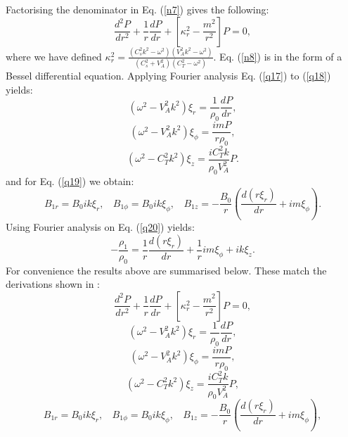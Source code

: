 \documentclass[12pt,a4paper,twoside]{article}
\begin{document}
Factorising the denominator in Eq. (\ref{n7}) gives the following:
\begin{equation}\label{n8}
 \frac{d^2P}{dr^2} + \frac{1}{r} \frac{dP}{dr}  + \left[ \kappa^2_r - \frac{m^2}{r^2}  \right] P =0 ,
\end{equation}
where we have defined $\kappa^2_r = \frac{ (C^2_sk^2-\omega^2)(V^2_Ak^2-\omega^2) }{(C_s^2+V^2_A) (C^2_T - \omega^2)  } $. Eq. (\ref{n8}) is in the form of a Bessel differential equation. Applying Fourier analysis Eq. (\ref{q17}) to (\ref{q18}) yields:
\begin{equation}
( \omega^2 - V^2_A k^2) \xi_r =  \frac{1}{\rho_0} \frac{dP}{dr} ,
\end{equation}
\begin{equation}
( \omega^2-V^2_A k^2) \xi_{\phi} = \frac{imP}{r \rho_0} ,
\end{equation}
\begin{equation}
(\omega^2 - C^2_T k^2) \xi_z = \frac{i C^2_T k}{\rho_0 V^2_A} P .
\end{equation}
and for Eq. (\ref{q19}) we obtain:
\begin{equation}
B_{1r} = B_0 i k \xi_r, \ \ \ \ B_{1 \phi} = B_0 i k \xi_{\phi}, \ \ \ \ B_{1z} = - \frac{B_0}{r} \left( \frac{d(r \xi_r)}{dr} + im \xi_{\phi} \right) .
\end{equation}
Using Fourier analysis on Eq. (\ref{q20}) yields:
\begin{equation}
 -\frac{\rho_1}{\rho_0} = \frac{1}{r} \frac{d(r \xi_r)}{dr}+ \frac{1}{r}im \xi_{\phi} + ik \xi_z .
\end{equation}
For convenience the results above are summarised below. These match the derivations shown in \cite{Ruderman2009}:
\begin{equation}\label{q38}
 \frac{d^2P}{dr^2} + \frac{1}{r} \frac{dP}{dr}  + \left[ \kappa^2_r - \frac{m^2}{r^2}  \right] P =0 ,
\end{equation}
\begin{equation}\label{q39}
( \omega^2 - V^2_A k^2) \xi_r =  \frac{1}{\rho_0} \frac{dP}{dr} ,
\end{equation}
\begin{equation}\label{q40}
( \omega^2-V^2_A k^2) \xi_{\phi} = \frac{imP}{r \rho_0} ,
\end{equation}
\begin{equation}\label{q41}
(\omega^2 - C^2_T k^2) \xi_z = \frac{i C^2_T k}{\rho_0 V^2_A} P ,
\end{equation}
\begin{equation}\label{q42}
B_{1r} = B_0 i k \xi_r, \ \ \ \ B_{1 \phi} = B_0 i k \xi_{\phi}, \ \ \ \ B_{1z} = - \frac{B_0}{r} \left( \frac{d(r \xi_r)}{dr} + im \xi_{\phi} \right) ,
\end{equation}
\end{document}
